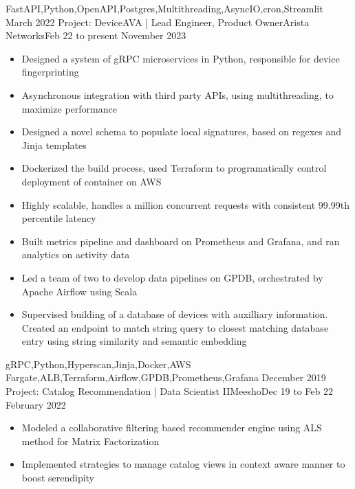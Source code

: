 \begin{experiences}
{\begin{itemize}
                      \end{itemize}
                    }
                    {FastAPI,Python,OpenAPI,Postgres,Multithreading,AsyncIO,cron,Streamlit}
  \emptySeparator
  \experience
    {March 2022}    {Project: DeviceAVA | Lead Engineer, Product Owner}{Arista Networks}{Feb 22 to present}
    {November 2023} {
                      \begin{itemize}
                        \item Designed a system of gRPC microservices in Python, responsible for device fingerprinting 
                        \item Asynchronous integration with third party APIs, using multithreading, to maximize performance
                        \item Designed a novel schema to populate local signatures, based on regexes and Jinja templates
                        \item Dockerized the build process, used Terraform to programatically control deployment of container on AWS
                        \item Highly scalable, handles a million concurrent requests with consistent 99.99th percentile latency
                        \item Built metrics pipeline and dashboard on Prometheus and Grafana, and ran analytics on activity data
                        \item Led a team of two to develop data pipelines on GPDB, orchestrated by Apache Airflow using Scala
                        \item Supervised building of a database of devices with auxilliary information. Created an endpoint to match string query to closest matching database entry using string similarity and semantic embedding
                      \end{itemize}
                    }
                    {gRPC,Python,Hyperscan,Jinja,Docker,AWS Fargate,ALB,Terraform,Airflow,GPDB,Prometheus,Grafana}
  \emptySeparator
  \experience
    {December 2019} {Project: Catalog Recommendation | Data Scientist II}{Meesho}{Dec 19 to Feb 22}
    {February 2022} {
                      \begin{itemize}
                        \item Modeled a collaborative filtering based recommender engine using ALS method for Matrix Factorization
                        \item Implemented strategies to manage catalog views in context aware manner to boost serendipity

\end{itemize}}
\end{experiences}

